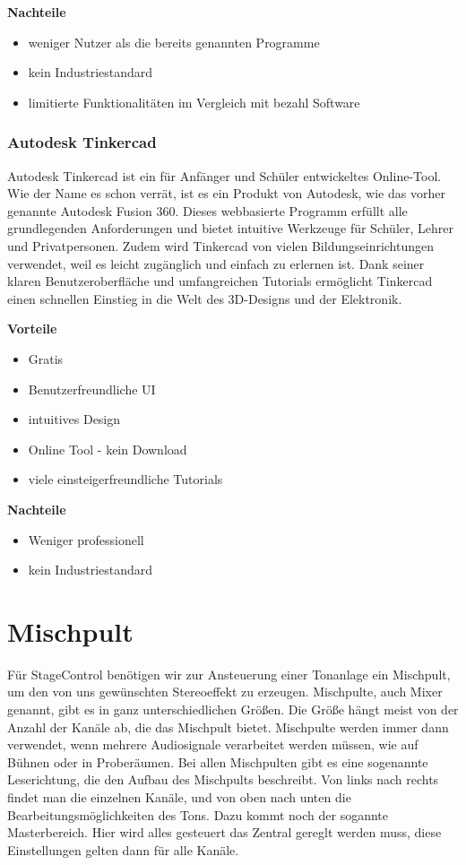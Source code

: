 \textbf{Nachteile}
\begin{itemize}
	\item weniger Nutzer als die bereits genannten Programme
	\item kein Industriestandard
	\item limitierte Funktionalitäten im Vergleich mit bezahl Software
\end{itemize}
\cite{FreeCADReviews}

\subsubsection{Autodesk Tinkercad}
Autodesk Tinkercad ist ein für Anfänger und Schüler entwickeltes Online-Tool. Wie der Name es schon verrät, ist es ein Produkt von Autodesk, wie das vorher genannte Autodesk Fusion 360. Dieses webbasierte Programm erfüllt alle grundlegenden Anforderungen und bietet intuitive Werkzeuge für Schüler, Lehrer und Privatpersonen. Zudem wird Tinkercad von vielen Bildungseinrichtungen verwendet, weil es leicht zugänglich und einfach zu erlernen ist. Dank seiner klaren Benutzeroberfläche und umfangreichen Tutorials ermöglicht Tinkercad einen schnellen Einstieg in die Welt des 3D-Designs und der Elektronik. 
\cite{Tinkercad}

\textbf{Vorteile}
\begin{itemize}
	\item Gratis
	\item Benutzerfreundliche UI
	\item intuitives Design
	\item Online Tool - kein Download 	
	\item viele einsteigerfreundliche Tutorials 
\end{itemize}

\textbf{Nachteile}
\begin{itemize}
	\item Weniger professionell
	\item kein Industriestandard 
\end{itemize}
\cite{TinkercadReviews}

\section{Mischpult}
 Für StageControl benötigen wir zur Ansteuerung einer Tonanlage ein Mischpult, um den von uns gewünschten Stereoeffekt zu erzeugen. Mischpulte, auch Mixer genannt, gibt es in ganz unterschiedlichen Größen. Die Größe hängt meist von der Anzahl der Kanäle ab, die das Mischpult bietet. Mischpulte werden immer dann verwendet, wenn mehrere Audiosignale verarbeitet werden müssen, wie auf Bühnen oder in Proberäumen. Bei allen Mischpulten gibt es eine sogenannte Leserichtung, die den Aufbau des Mischpults beschreibt. Von links nach rechts findet man die einzelnen Kanäle, und von oben nach unten die Bearbeitungsmöglichkeiten des Tons. Dazu kommt noch der sogannte Masterbereich. Hier wird alles gesteuert das Zentral gereglt werden muss, diese Einstellungen gelten dann für alle Kanäle.
\cite{Mischpult_Information}  \cite{Mischpult_Master}

